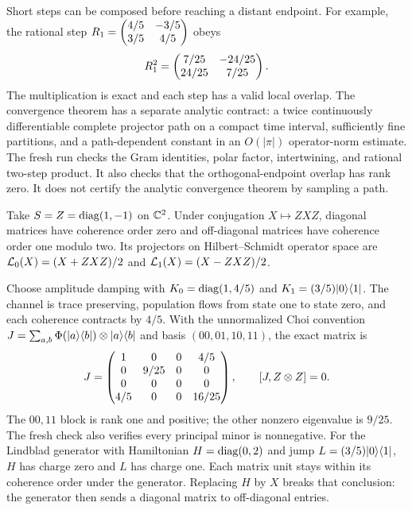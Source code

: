 Short steps can be composed before reaching a distant endpoint. For example, the rational step $R_1=\begin{pmatrix}4/5&-3/5\\3/5&4/5\end{pmatrix}$ obeys
\[
R_1^2=\begin{pmatrix}7/25&-24/25\\24/25&7/25\end{pmatrix}.
\]
The multiplication is exact and each step has a valid local overlap. The convergence theorem has a separate analytic contract: a twice continuously differentiable complete projector path on a compact time interval, sufficiently fine partitions, and a path-dependent constant in an $O(|\pi|)$ operator-norm estimate.
The fresh run checks the Gram identities, polar factor, intertwining, and rational two-step product. It also checks that the orthogonal-endpoint overlap has rank zero. It does not certify the analytic convergence theorem by sampling a path.

Take $S=Z=\operatorname{diag}(1,-1)$ on $\mathbb C^2$. Under conjugation $X\mapsto ZXZ$, diagonal matrices have coherence order zero and off-diagonal matrices have coherence order one modulo two. Its projectors on Hilbert--Schmidt operator space are $\mathcal L_0(X)=(X+ZXZ)/2$ and $\mathcal L_1(X)=(X-ZXZ)/2$.

Choose amplitude damping with $K_0=\operatorname{diag}(1,4/5)$ and $K_1=(3/5)\lvert 0\rangle\langle 1\rvert$. The channel is trace preserving, population flows from state one to state zero, and each coherence contracts by $4/5$.
With the unnormalized Choi convention $J=\sum_{a,b}\Phi(\lvert a\rangle\langle b\rvert)\otimes\lvert a\rangle\langle b\rvert$ and basis $(00,01,10,11)$, the exact matrix is
\[
J=\begin{pmatrix}1&0&0&4/5\\0&9/25&0&0\\0&0&0&0\\4/5&0&0&16/25\end{pmatrix},
\qquad [J,Z\otimes Z]=0.
\]
The $00,11$ block is rank one and positive; the other nonzero eigenvalue is $9/25$. The fresh check also verifies every principal minor is nonnegative.
For the Lindblad generator with Hamiltonian $H=\operatorname{diag}(0,2)$ and jump $L=(3/5)\lvert 0\rangle\langle 1\rvert$, $H$ has charge zero and $L$ has charge one. Each matrix unit stays within its coherence order under the generator. Replacing $H$ by $X$ breaks that conclusion: the generator then sends a diagonal matrix to off-diagonal entries.

